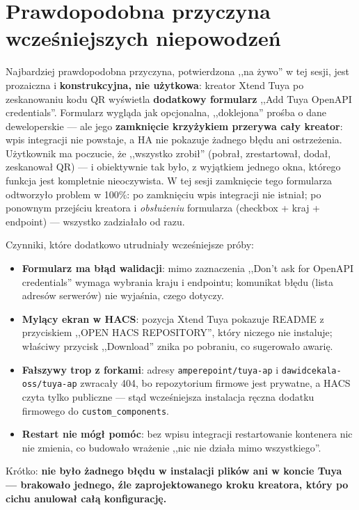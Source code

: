 \documentclass[11pt,a4paper]{article}
\begin{document}
\section{Prawdopodobna przyczyna wcześniejszych niepowodzeń}
\label{sec:przyczyna}

Najbardziej prawdopodobna przyczyna, potwierdzona ,,na żywo'' w tej sesji, jest prozaiczna i \textbf{konstrukcyjna, nie użytkowa}: kreator Xtend Tuya po zeskanowaniu kodu QR wyświetla \textbf{dodatkowy formularz} ,,Add Tuya OpenAPI credentials''. Formularz wygląda jak opcjonalna, ,,doklejona'' prośba o dane deweloperskie --- ale jego \textbf{zamknięcie krzyżykiem przerywa cały kreator}: wpis integracji nie powstaje, a HA nie pokazuje żadnego błędu ani ostrzeżenia. Użytkownik ma poczucie, że ,,wszystko zrobił'' (pobrał, zrestartował, dodał, zeskanował QR) --- i obiektywnie tak było, z wyjątkiem jednego okna, którego funkcja jest kompletnie nieoczywista. W tej sesji zamknięcie tego formularza odtworzyło problem w 100\%: po zamknięciu wpis integracji nie istniał; po ponownym przejściu kreatora i \emph{obsłużeniu} formularza (checkbox + kraj + endpoint) --- wszystko zadziałało od razu.

Czynniki, które dodatkowo utrudniały wcześniejsze próby:
\begin{itemize}
\item \textbf{Formularz ma błąd walidacji}: mimo zaznaczenia ,,Don't ask for OpenAPI credentials'' wymaga wybrania kraju i endpointu; komunikat błędu (lista adresów serwerów) nie wyjaśnia, czego dotyczy.
\item \textbf{Mylący ekran w HACS}: pozycja Xtend Tuya pokazuje README z przyciskiem ,,OPEN HACS REPOSITORY'', który niczego nie instaluje; właściwy przycisk ,,Download'' znika po pobraniu, co sugerowało awarię.
\item \textbf{Fałszywy trop z forkami}: adresy \texttt{amperepoint/tuya-ap} i \texttt{dawidcekala-oss/tuya-ap} zwracały 404, bo repozytorium firmowe jest prywatne, a HACS czyta tylko publiczne --- stąd wcześniejsza instalacja ręczna dodatku firmowego do \texttt{custom\_components}.
\item \textbf{Restart nie mógł pomóc}: bez wpisu integracji restartowanie kontenera nic nie zmienia, co budowało wrażenie ,,nic nie działa mimo wszystkiego''.
\end{itemize}

Krótko: \textbf{nie było żadnego błędu w instalacji plików ani w koncie Tuya --- brakowało jednego, źle zaprojektowanego kroku kreatora, który po cichu anulował całą konfigurację.}
\end{document}
